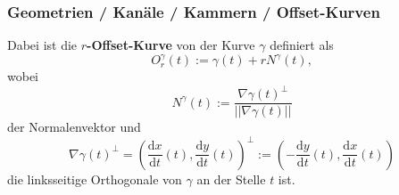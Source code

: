 \documentclass[8pt, aspectratio=169]{beamer}
\newcommand{\derivative}[2]{\frac{\textrm{d}{#1}}{\textrm{d}{#2}}}
\begin{document}
\begin{frame}
	\frametitle{Geometrien / Kanäle / Kammern / Offset-Kurven}
	\vspace{-0.25cm}\hspace{-0.5cm}
	\centering
	\begin{minipage}[c]{.6\textwidth}
		Dabei ist die \textbf{$r$-Offset-Kurve} von der Kurve $\gamma$ definiert als
			$$O^\gamma_r(t) := \gamma(t) + rN^\gamma(t),$$
		wobei
			$$N^\gamma(t) := \frac{\nabla\gamma(t)^\perp}{||\nabla\gamma(t)||}$$
		der Normalenvektor und
			$$\nabla\gamma(t)^\perp = \left(\derivative{x}{t}(t), \derivative{y}{t}(t)\right)^\perp := \left(-\derivative{y}{t}(t), \derivative{x}{t}(t)\right)$$
		die linksseitige Orthogonale von $\gamma$ an der Stelle $t$ ist.
	\end{minipage}
	\begin{minipage}[c]{.39\textwidth}
		\begin{figure}[H]
			
		\end{figure}
	\end{minipage}
	\vfill
\end{frame}
\end{document}
